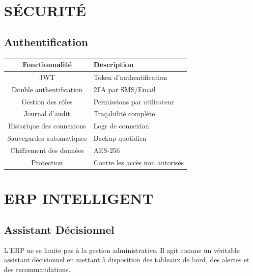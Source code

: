 \documentclass[12pt,a4paper,oneside]{book}
\begin{document}
\chapter{SÉCURITÉ}

\section{Authentification}
\begin{center}
\begin{tabular}{|c|p{10cm}|}
\hline
\rowcolor{electronblue}
\color{white}\textbf{Fonctionnalité} & \color{white}\textbf{Description} \\
\hline
JWT & Token d'authentification \\
\hline
Double authentification & 2FA par SMS/Email \\
\hline
Gestion des rôles & Permissions par utilisateur \\
\hline
Journal d'audit & Traçabilité complète \\
\hline
Historique des connexions & Logs de connexion \\
\hline
Sauvegardes automatiques & Backup quotidien \\
\hline
Chiffrement des données & AES-256 \\
\hline
Protection & Contre les accès non autorisés \\
\hline
\end{tabular}
\end{center}

\chapter{ERP INTELLIGENT}

\section{Assistant Décisionnel}
L'ERP ne se limite pas à la gestion administrative. Il agit comme un véritable assistant décisionnel en mettant à disposition des tableaux de bord, des alertes et des recommandations.
\end{document}
